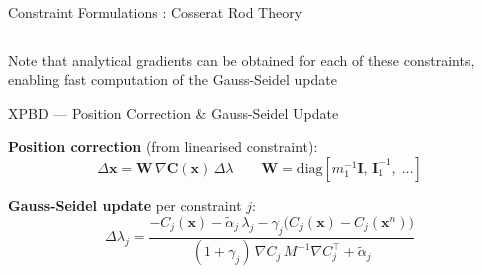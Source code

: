 \documentclass[aspectratio=169]{beamer}
\begin{document}
\begin{frame}{Constraint Formulations : Cosserat Rod Theory}
\begin{columns}[T]
  \end{columns}
  \vspace{0.8em}
  \begin{tcolorbox}[colback=gray!10, colframe=gray!40, arc=3pt, boxrule=0.6pt]
    \small
    Note that analytical gradients can be obtained for each of these constraints, enabling fast computation of the Gauss-Seidel update
  \end{tcolorbox}
\end{frame}


\begin{frame}{XPBD — Position Correction \& Gauss-Seidel Update}

  \textbf{Position correction} (from linearised constraint):
  \begin{equation*}
    \Delta \mathbf{x} = \mathbf{W}\,\nabla \mathbf{C}(\mathbf{x})\,\Delta\lambda
    \qquad
    \mathbf{W} = \mathrm{diag}\!\left[m_1^{-1}\mathbf{I},\,\mathbf{I}_1^{-1},\;\ldots\right]
  \end{equation*}

  \vspace{0.3em}
  \textbf{Gauss-Seidel update} per constraint $j$:
  \begin{equation*}
    \Delta \lambda_j =
    \frac{
      -C_j(\mathbf{x})
      - \tilde{\alpha}_j\,\lambda_j
      - \gamma_j\bigl(C_j(\mathbf{x}) - C_j(\mathbf{x}^n)\bigr)
    }{
      (1+\gamma_j)\,\nabla C_j\,M^{-1}\nabla C_j^\top + \tilde{\alpha}_j
    }
  \end{equation*}


\end{frame}
\end{document}
